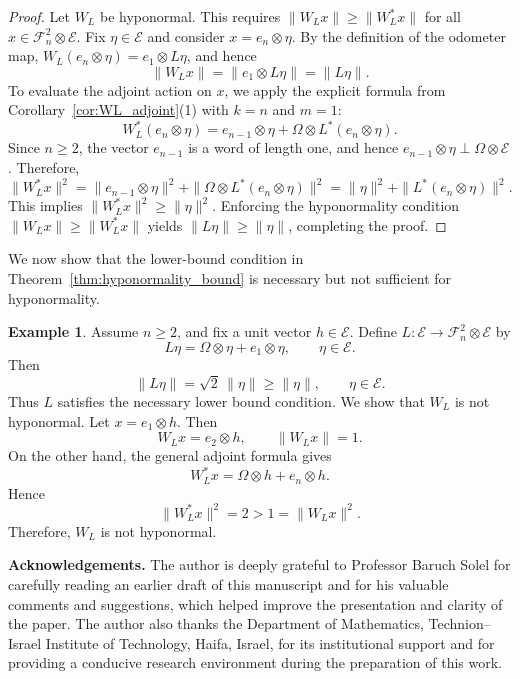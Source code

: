 \documentclass[12pt]{amsart}
\theoremstyle{definition}
\newtheorem{example}[theorem]{Example}
\theoremstyle{remark}
\newcommand{\cle}{\mathcal{E}}
\newcommand{\clf}{\mathcal{F}}
\numberwithin{equation}{section}
\begin{document}
\begin{proof}
Let $W_L$ be hyponormal. This requires $\|W_L x\| \ge \|W_L^* x\|$ for all $x \in \clf_n^2 \otimes \cle$. Fix $\eta \in \cle$ and consider $x = e_n \otimes \eta$. 
By the definition of the odometer map, $W_L(e_n \otimes \eta) = e_1 \otimes L\eta$, and hence 
\[
\|W_L x\| = \|e_1 \otimes L\eta\| = \|L\eta\|.
\]
To evaluate the adjoint action on $x$, we apply the explicit formula from Corollary~\ref{cor:WL_adjoint}(1) with $k=n$ and $m=1$:
\[
W_L^*(e_n \otimes \eta) = e_{n-1} \otimes \eta + \Omega \otimes L^*(e_n \otimes \eta).
\]
Since \(n\ge2\), the vector \(e_{n-1}\) is a word of length one, and hence
\(e_{n-1}\otimes\eta\perp \Omega\otimes\cle\). Therefore,
\[
\|W_L^* x\|^2 = \|e_{n-1} \otimes \eta\|^2 + \|\Omega \otimes L^*(e_n \otimes \eta)\|^2 = \|\eta\|^2 + \|L^*(e_n \otimes \eta)\|^2.
\]
This implies $\|W_L^* x\|^2 \ge \|\eta\|^2$. Enforcing the hyponormality condition $\|W_L x\| \ge \|W_L^* x\|$ yields $\|L\eta\| \ge \|\eta\|$, completing the proof.
\end{proof}

We now show that the lower-bound condition in Theorem~\ref{thm:hyponormality_bound}
is necessary but not sufficient for hyponormality.

\begin{example}
Assume $n\ge2$, and fix a unit vector $h\in\cle$. Define
\(L:\cle\to\clf_n^2\otimes\cle\) by
\[
L\eta=\Omega\otimes\eta+e_1\otimes\eta,
\qquad \eta\in\cle.
\]
Then
\[
\|L\eta\|=\sqrt2\,\|\eta\|\geq \|\eta\|,
\qquad \eta\in\cle.
\]
Thus $L$ satisfies the necessary lower bound condition.
We show that $W_L$ is not hyponormal. Let $x=e_1\otimes h$. Then
\[
W_Lx=e_2\otimes h,
\qquad
\|W_Lx\|=1.
\]
On the other hand, the general adjoint formula gives
\[
W_L^*x=\Omega\otimes h+e_n\otimes h.
\]
Hence
\[
\|W_L^*x\|^2=2>1=\|W_Lx\|^2.
\]
Therefore, $W_L$ is not hyponormal.
\end{example}




\noindent\textbf{Acknowledgements.}
The author is deeply grateful to Professor Baruch Solel for carefully reading an
earlier draft of this manuscript and for his valuable comments and suggestions,
which helped improve the presentation and clarity of the paper. The author also
thanks the Department of Mathematics, Technion--Israel Institute of Technology,
Haifa, Israel, for its institutional support and for providing a conducive
research environment during the preparation of this work.
\end{document}
